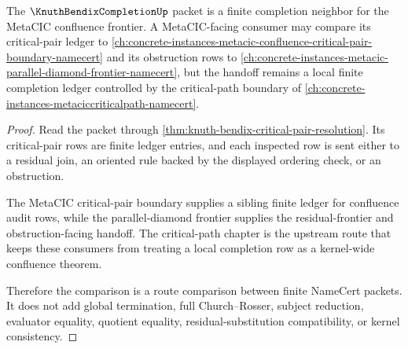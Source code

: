 \begin{theorem}
\label{thm:knuth-bendix-metacic-frontier-handoff}
The $\KnuthBendixCompletionUp$ packet is a finite completion neighbor for the MetaCIC confluence frontier. A MetaCIC-facing consumer may compare its critical-pair ledger to \autoref{ch:concrete-instances-metacic-confluence-critical-pair-boundary-namecert} and its obstruction rows to \autoref{ch:concrete-instances-metacic-parallel-diamond-frontier-namecert}, but the handoff remains a local finite completion ledger controlled by the critical-path boundary of \autoref{ch:concrete-instances-metaciccriticalpath-namecert}.
\end{theorem}
\begin{proof}
Read the packet through \autoref{thm:knuth-bendix-critical-pair-resolution}. Its critical-pair rows are finite ledger entries, and each inspected row is sent either to a residual join, an oriented rule backed by the displayed ordering check, or an obstruction.

The MetaCIC critical-pair boundary supplies a sibling finite ledger for confluence audit rows, while the parallel-diamond frontier supplies the residual-frontier and obstruction-facing handoff. The critical-path chapter is the upstream route that keeps these consumers from treating a local completion row as a kernel-wide confluence theorem.

Therefore the comparison is a route comparison between finite NameCert packets. It does not add global termination, full Church--Rosser, subject reduction, evaluator equality, quotient equality, residual-substitution compatibility, or kernel consistency.
\end{proof}




